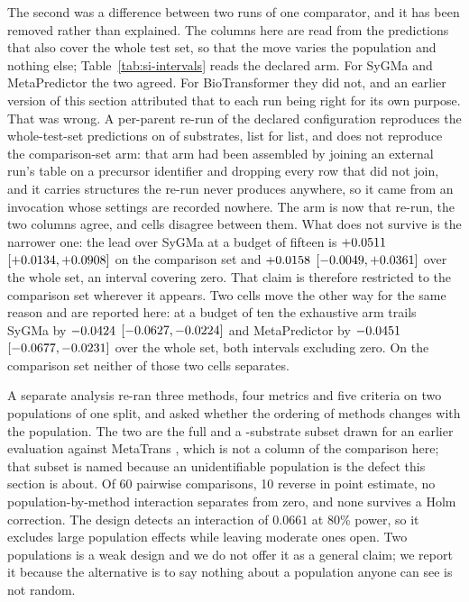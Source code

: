 \documentclass[journal=jcisd8,manuscript=suppinfo,layout=onecolumn]{achemso}
\begin{document}
The second was a difference between two runs of one comparator, and it has been removed rather
than explained. The columns here are read from the predictions that also cover the whole test set,
so that the move varies the population and nothing else; Table~\ref{tab:si-intervals} reads the
declared arm. For SyGMa and MetaPredictor the two agreed. For BioTransformer they did not, and an
earlier version of this section attributed that to each run being right for its own purpose. That
was wrong. A per-parent re-run of the declared configuration reproduces the whole-test-set
predictions on \numBtstepsWholeIdentical{} of \numBtstepsWholeShared{} substrates, list for list,
and does not reproduce the comparison-set arm: that arm had been assembled by joining an external
run's table on a precursor identifier and dropping every row that did not join, and it carries
\numBtstepsCompOrphans{} structures the re-run never produces anywhere, so it came from an
invocation whose settings are recorded nowhere. The arm is now that re-run, the two columns agree,
and \numSTwoNineBtdisagreements{} cells disagree between them. What does not survive is the
narrower one: the lead over SyGMa at a budget of fifteen is
$+0.0511$ $[+0.0134,
+0.0908]$ on the comparison set and
$+0.0158$ $[-0.0049,
+0.0361]$ over the whole set, an interval covering zero. That claim is
therefore restricted to the comparison set wherever it appears. Two cells move the other way for
the same reason and are reported here: at a budget of ten the exhaustive
arm trails SyGMa by $-0.0424$ $[-0.0627,
-0.0224]$ and MetaPredictor by
$-0.0451$ $[-0.0677,
-0.0231]$ over the whole set, both intervals excluding zero.
On the comparison set neither of those two cells separates.

A separate analysis re-ran three
methods, four metrics and five criteria on two populations of one split, and asked whether the
ordering of methods changes with the population. The two are the full \numPopulationTestsubs{}
and a \numBtN{}-substrate subset drawn for an earlier evaluation against MetaTrans
\citep{Litsa_2020}, which is not a column of the comparison here; that subset is named because an
unidentifiable population is the defect this section is about. Of 60 pairwise comparisons, 10
reverse in point estimate,
no population-by-method interaction separates from zero, and none survives a Holm correction. The
design detects an interaction of $0.0661$ at 80\% power, so it excludes large population effects
while leaving moderate ones open. Two populations is a weak design and we do not offer it as a
general claim; we report it because the alternative is to say nothing about a population anyone
can see is not random.
\end{document}
